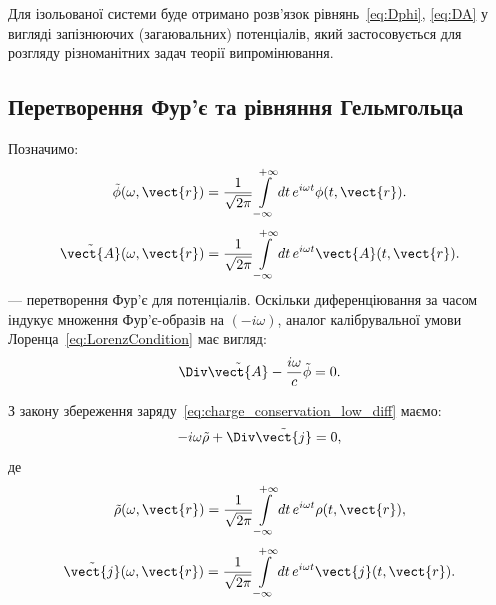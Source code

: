 Для ізольованої системи буде отримано розв'язок рівнянь~\eqref{eq:Dphi}, \eqref{eq:DA} у вигляді запізнюючих
(загаювальних) потенціалів, який застосовується для розгляду різноманітних задач теорії випромінювання.



\subsection*{Перетворення Фур'є та рівняння Гельмгольца}

Позначимо:
\begin{equation}\label{eq:tilde_phi}
	\tilde{\phi}(\omega, \vect{r}) = \frac{1}{\sqrt{2\pi}} \int\limits_{-\infty}^{+\infty} dt \, e^{i \omega t} \phi(t, \vect{r}).
\end{equation}
\begin{equation}\label{eq:tilde_A}
	\tilde{\vect{A}}(\omega, \vect{r}) = \frac{1}{\sqrt{2\pi}} \int\limits_{-\infty}^{+\infty} dt \, e^{i \omega t} \vect{A}(t, \vect{r}).
\end{equation}
--- перетворення Фур'є для потенціалів. Оскільки диференціювання за часом індукує множення Фур'є-образів на \((-i
\omega)\), аналог калібрувальної умови Лоренца~\eqref{eq:LorenzCondition} має вигляд:
\begin{equation}
	\Div \tilde{\vect{A}} - \frac{i \omega}{c} \tilde{\phi} = 0.
\end{equation}

З закону збереження заряду~\eqref{eq:charge_conservation_low_diff} маємо:
\begin{equation}
	-i \omega \tilde{\rho} + \Div \tilde{\vect{j}} = 0,
\end{equation}
де
\begin{equation}
	\tilde{\rho}(\omega, \vect{r}) = \frac{1}{\sqrt{2\pi}} \int\limits_{-\infty}^{+\infty} dt \, e^{i \omega t} \rho(t, \vect{r}),
\end{equation}
\begin{equation}
	\tilde{\vect{j}}(\omega, \vect{r}) = \frac{1}{\sqrt{2\pi}} \int\limits_{-\infty}^{+\infty} dt \, e^{i \omega t} \vect{j}(t, \vect{r}).
\end{equation}

